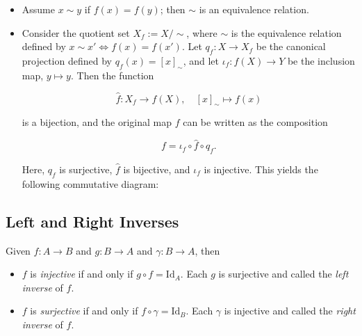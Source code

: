 \begin{itemize}

	\item Assume \(x \sim y\) if \(f(x) = f(y)\); then \(\sim\) is an equivalence relation.

	\item Consider the quotient set \( X_f := X/\sim \), where \( \sim \) is the equivalence relation 
	      defined by \( x \sim x' \iff f(x) = f(x') \). Let \( q_f : X \to X_f \) be the canonical 
		  projection defined by \( q_f(x) = [x]_{\sim} \), and let \( \iota_f : f(X) \to Y \) be the inclusion  
		  map, \( y \mapsto y \). Then the function
	      
		  \[
		      \hat{f} : X_f \to f(X), \quad [x]_{\sim} \mapsto f(x)
	      \]
	  
		  is a bijection, and the original map \(f\) can be written as the composition
	 
		  \[
		      f = \iota_f \circ \hat{f} \circ q_f.
	      \]
	 
		  Here, \( q_f \) is surjective, \( \hat{f} \) is bijective, and \( \iota_f \) is injective. 
		  This yields the following commutative diagram:
	      
		  \begin{center}
	      \end{center}

\end{itemize}

\subsection{Left and Right Inverses}

Given \(f : A \to B\) and \(g: B \to A\) and \(\gamma: B \to A\), then  

\begin{itemize}
	
	\item \(f\) is \emph{injective} if and only if \(g \circ f = \mathrm{Id}_A\). Each \(g\) is surjective and called the \emph{left inverse} of \(f\).


	\item \(f\) is \emph{surjective} if and only if \(f \circ \gamma = \mathrm{Id}_B\). Each \(\gamma\) is injective and called the \emph{right inverse} of \(f\).
	
\end{itemize}

